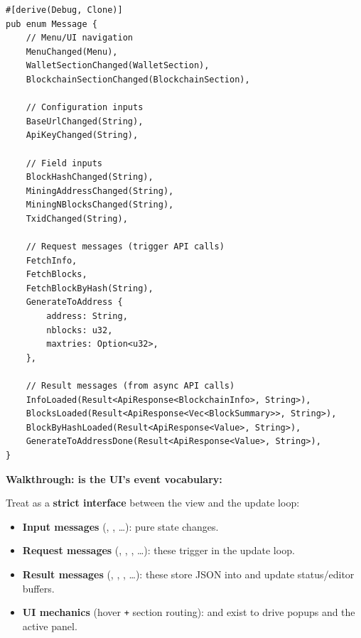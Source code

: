 \begin{listing}[htbp]
\caption{Message enum (excerpt) ()}
\label{lst:ch16-message-enum}
\begin{verbatim}
#[derive(Debug, Clone)]
pub enum Message {
    // Menu/UI navigation
    MenuChanged(Menu),
    WalletSectionChanged(WalletSection),
    BlockchainSectionChanged(BlockchainSection),

    // Configuration inputs
    BaseUrlChanged(String),
    ApiKeyChanged(String),

    // Field inputs
    BlockHashChanged(String),
    MiningAddressChanged(String),
    MiningNBlocksChanged(String),
    TxidChanged(String),

    // Request messages (trigger API calls)
    FetchInfo,
    FetchBlocks,
    FetchBlockByHash(String),
    GenerateToAddress {
        address: String,
        nblocks: u32,
        maxtries: Option<u32>,
    },

    // Result messages (from async API calls)
    InfoLoaded(Result<ApiResponse<BlockchainInfo>, String>),
    BlocksLoaded(Result<ApiResponse<Vec<BlockSummary>>, String>),
    BlockByHashLoaded(Result<ApiResponse<Value>, String>),
    GenerateToAddressDone(Result<ApiResponse<Value>, String>),
}
\end{verbatim}
\end{listing}

\textbf{Walkthrough:  is the UI's event vocabulary:}

Treat  as a \textbf{strict interface} between the view and the update loop:

\begin{itemize}
  \item \textbf{Input messages} (, , \ldots): pure state changes.
  \item \textbf{Request messages} (, , , \ldots): these trigger  in the update loop.
  \item \textbf{Result messages} (, , , \ldots): these store JSON into  and update status/editor buffers.
  \item \textbf{UI mechanics} (hover \texttt{+} section routing):  and  exist to drive popups and the active panel.
\end{itemize}

